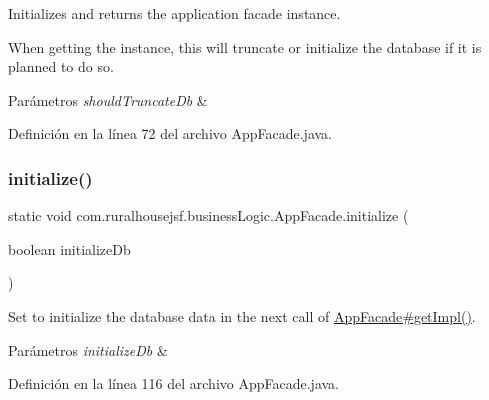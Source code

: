Initializes and returns the application facade instance. 

When getting the instance, this will truncate or initialize the database if it is planned to do so.


\begin{DoxyParams}{Parámetros}
{\em should\+Truncate\+Db} & \\
\hline
\end{DoxyParams}


Definición en la línea 72 del archivo App\+Facade.\+java.

\mbox{\label{classcom_1_1ruralhousejsf_1_1business_logic_1_1_app_facade_a48252ec119a6bb16f5353df6ec6eff54}} 
\subsubsection{\texorpdfstring{initialize()}{initialize()}}
{\footnotesize\ttfamily static void com.\+ruralhousejsf.\+business\+Logic.\+App\+Facade.\+initialize (\begin{DoxyParamCaption}\item[{boolean}]{initialize\+Db }\end{DoxyParamCaption})\hspace{0.3cm}{\ttfamily [static]}}



Set to initialize the database data in the next call of \mbox{\hyperlink{classcom_1_1ruralhousejsf_1_1business_logic_1_1_app_facade_a029bcceee98b9070b9f80abc54db45d6}{App\+Facade\#get\+Impl()}}. 


\begin{DoxyParams}{Parámetros}
{\em initialize\+Db} & \\
\hline
\end{DoxyParams}


Definición en la línea 116 del archivo App\+Facade.\+java.

\mbox{\label{classcom_1_1ruralhousejsf_1_1business_logic_1_1_app_facade_a0486115e3ba238d025e23ec62548b3bc}} 
